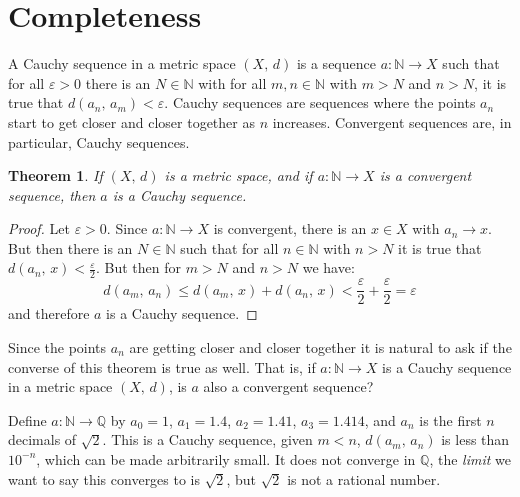 \documentclass{article}
\theoremstyle{plain}
\newtheorem{theorem}{Theorem}[section]
\theoremstyle{normal}
\newenvironment{example}{%
    \pushQED{\qed}\renewcommand{\qedsymbol}{$\blacksquare$}\examplex%
}{%
    \popQED\endexamplex%
}
\newenvironment{definition}{%
    \pushQED{\qed}\renewcommand{\qedsymbol}{$\blacksquare$}\definitionx%
}{%
    \popQED\enddefinitionx%
}
\begin{document}
    \section{Completeness}
        \begin{definition}[\textbf{Cauchy Sequences}]
            A Cauchy sequence in a metric space $(X,\,d)$ is a sequence
            $a:\mathbb{N}\rightarrow{X}$ such that for all $\varepsilon>0$ there
            is an $N\in\mathbb{N}$ with for all $m,n\in\mathbb{N}$ with
            $m>N$ and $n>N$, it is true that $d(a_{n},\,a_{m})<\varepsilon$.
        \end{definition}
        Cauchy sequences are sequences where the points $a_{n}$ start to get
        closer and closer together as $n$ increases. Convergent sequences are,
        in particular, Cauchy sequences.
        \begin{theorem}
            If $(X,\,d)$ is a metric space, and if $a:\mathbb{N}\rightarrow{X}$
            is a convergent sequence, then $a$ is a Cauchy sequence.
        \end{theorem}
        \begin{proof}
            Let $\varepsilon>0$. Since $a:\mathbb{N}\rightarrow{X}$ is
            convergent, there is an $x\in{X}$ with $a_{n}\rightarrow{x}$. But
            then there is an $N\in\mathbb{N}$ such that for all $n\in\mathbb{N}$
            with $n>N$ it is true that $d(a_{n},\,x)<\frac{\varepsilon}{2}$.
            But then for $m>N$ and $n>N$ we have:
            \begin{equation}
                d(a_{m},\,a_{n})\leq
                d(a_{m},\,x)+d(a_{n},\,x)<
                \frac{\varepsilon}{2}+\frac{\varepsilon}{2}
                =\varepsilon
            \end{equation}
            and therefore $a$ is a Cauchy sequence.
        \end{proof}
        Since the points $a_{n}$ are getting closer and closer together it is
        natural to ask if the converse of this theorem is true as well. That is,
        if $a:\mathbb{N}\rightarrow{X}$ is a Cauchy sequence in a metric space
        $(X,\,d)$, is $a$ also a convergent sequence?
        \begin{example}
            Define $a:\mathbb{N}\rightarrow\mathbb{Q}$ by
            $a_{0}=1$, $a_{1}=1.4$, $a_{2}=1.41$, $a_{3}=1.414$, and
            $a_{n}$ is the first $n$ decimals of $\sqrt{2}$. This is a
            Cauchy sequence, given $m<n$,
            $d(a_{m},\,a_{n})$ is less than $10^{-n}$, which can be made
            arbitrarily small. It does not converge in $\mathbb{Q}$, the
            \textit{limit} we want to say this converges to is
            $\sqrt{2}$, but $\sqrt{2}$ is not a rational number.
        \end{example}
\end{document}
